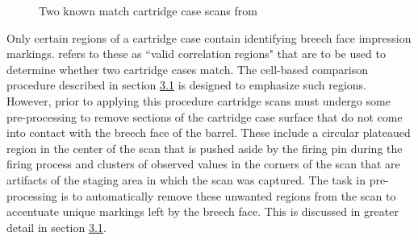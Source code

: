 \begin{Schunk}
\begin{figure}[htbp]

{\centering {}

}

\caption{\label{fig:cartridgeCasePair} Two known match cartridge case scans from \citet{fadul_empirical_nodate}}\label{fig:rawBFs}
\end{figure}
\end{Schunk}

Only certain regions of a cartridge case contain identifying breech face
impression markings. \citet{song_proposed_2013} refers to these as
``valid correlation regions" that are to be used to determine whether
two cartridge cases match. The cell-based comparison procedure described
in section \protect\hyperlink{comparisonProcedure}{3.1} is designed to
emphasize such regions. However, prior to applying this procedure
cartridge scans must undergo some pre-processing to remove sections of
the cartridge case surface that do not come into contact with the breech
face of the barrel. These include a circular plateaued region in the
center of the scan that is pushed aside by the firing pin during the
firing process and clusters of observed values in the corners of the
scan that are artifacts of the staging area in which the scan was
captured. The task in pre-processing is to automatically remove these
unwanted regions from the scan to accentuate unique markings left by the
breech face. This is discussed in greater detail in section
\protect\hyperlink{preProcessing}{3.1}.

